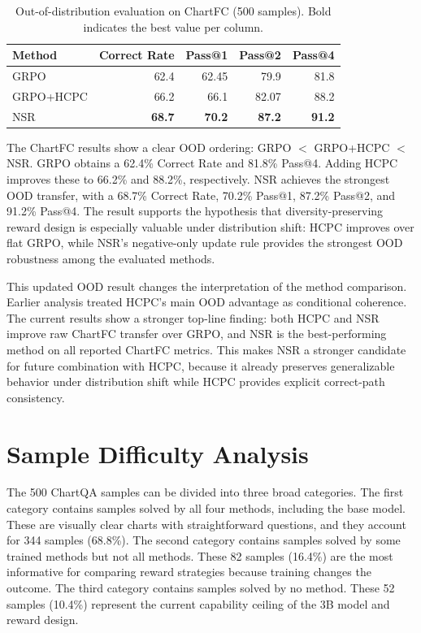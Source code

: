 \documentclass{iutbscthesis}
\begin{document}
\begin{table}[H]
    \centering
    \small
    \begin{tabular}{lrrrr}
        \toprule
        Method & Correct Rate & Pass@1 & Pass@2 & Pass@4 \\
        \midrule
        GRPO & 62.4 & 62.45 & 79.9 & 81.8 \\
        GRPO+HCPC & 66.2 & 66.1 & 82.07 & 88.2 \\
        NSR & \textbf{68.7} & \textbf{70.2} & \textbf{87.2} & \textbf{91.2} \\
        \bottomrule
    \end{tabular}
    \caption{Out-of-distribution evaluation on ChartFC (500 samples). Bold indicates the best value per column.}
    \label{tab:chartfc_results}
\end{table}

The ChartFC results show a clear OOD ordering: GRPO $<$ GRPO+HCPC $<$ NSR. GRPO obtains a 62.4\% Correct Rate and 81.8\% Pass@4. Adding HCPC improves these to 66.2\% and 88.2\%, respectively. NSR achieves the strongest OOD transfer, with a 68.7\% Correct Rate, 70.2\% Pass@1, 87.2\% Pass@2, and 91.2\% Pass@4. The result supports the hypothesis that diversity-preserving reward design is especially valuable under distribution shift: HCPC improves over flat GRPO, while NSR's negative-only update rule provides the strongest OOD robustness among the evaluated methods.

This updated OOD result changes the interpretation of the method comparison. Earlier analysis treated HCPC's main OOD advantage as conditional coherence. The current results show a stronger top-line finding: both HCPC and NSR improve raw ChartFC transfer over GRPO, and NSR is the best-performing method on all reported ChartFC metrics. This makes NSR a stronger candidate for future combination with HCPC, because it already preserves generalizable behavior under distribution shift while HCPC provides explicit correct-path consistency.

\section{Sample Difficulty Analysis}

The 500 ChartQA samples can be divided into three broad categories. The first category contains samples solved by all four methods, including the base model. These are visually clear charts with straightforward questions, and they account for 344 samples (68.8\%). The second category contains samples solved by some trained methods but not all methods. These 82 samples (16.4\%) are the most informative for comparing reward strategies because training changes the outcome. The third category contains samples solved by no method. These 52 samples (10.4\%) represent the current capability ceiling of the 3B model and reward design.
\end{document}
